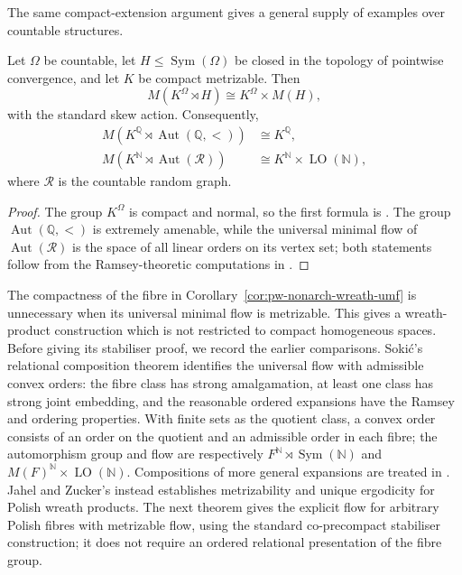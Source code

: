 The same compact-extension argument gives a general supply of examples over
countable structures.

\begin{corollary}\label{cor:pw-nonarch-wreath-umf}
Let \(\Omega\) be countable, let
\(H\leq\operatorname{Sym}(\Omega)\) be closed in the topology of pointwise
convergence, and let \(K\) be compact metrizable. Then
\[
 M(K^\Omega\rtimes H)\cong K^\Omega\times M(H),
\]
with the standard skew action. Consequently,
\begin{align*}
 M(K^{\mathbb Q}\rtimes\operatorname{Aut}(\mathbb Q,<))
 &\cong K^{\mathbb Q},\\
 M(K^{\mathbb N}\rtimes\operatorname{Aut}(\mathcal R))
 &\cong K^{\mathbb N}\times\operatorname{LO}(\mathbb N),
\end{align*}
where \(\mathcal R\) is the countable random graph.
\end{corollary}

\begin{proof}
The group \(K^\Omega\) is compact and normal, so the first formula is
\cite[Proposition~6.1]{KechrisSokic2012}. The group
\(\operatorname{Aut}(\mathbb Q,<)\) is extremely amenable, while the universal
minimal flow of \(\operatorname{Aut}(\mathcal R)\) is the space of all linear
orders on its vertex set; both statements follow from the Ramsey-theoretic
computations in \cite{KPT2005}.
\end{proof}

The compactness of the fibre in Corollary~\ref{cor:pw-nonarch-wreath-umf} is
unnecessary when its universal minimal flow is metrizable.  This gives a
wreath-product construction which is not restricted to compact homogeneous
spaces. Before giving its stabiliser proof, we record the earlier comparisons.
Soki\'c's relational composition theorem \cite[Theorem~6.5(v)]{Sokic2013}
identifies the universal flow with admissible convex orders: the fibre class
has strong amalgamation, at least one class has strong joint embedding, and
the reasonable ordered expansions have the Ramsey and ordering properties. With finite
sets as the quotient class, a convex order consists of an order on the
quotient and an admissible order in each fibre; the automorphism group and
flow are respectively \(F^{\mathbb N}\rtimes\operatorname{Sym}(\mathbb N)\) and
\(M(F)^{\mathbb N}\times\operatorname{LO}(\mathbb N)\). Compositions of more general
expansions are treated in \cite[Proposition~2.2 of the 2017 preprint]{PawliukSokic2020}.
Jahel and Zucker's \cite[Theorem~5.1]{JahelZucker2026} instead establishes metrizability
and unique ergodicity for Polish wreath products. The next theorem gives the
explicit flow for arbitrary Polish fibres with metrizable flow, using the
standard co-precompact stabiliser construction; it does not require an ordered
relational presentation of the fibre group.

